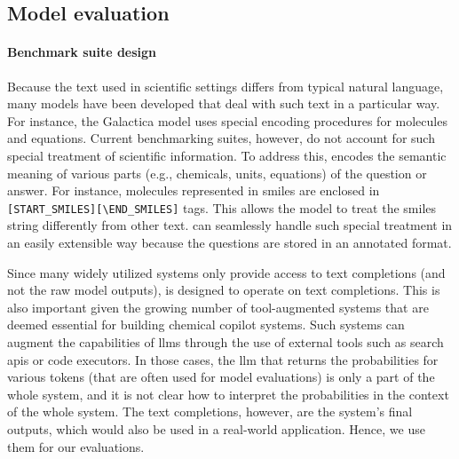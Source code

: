 \documentclass[11pt, oneside]{article}
\begin{document}
\begin{refsection}
\subsection{Model evaluation}

\paragraph{Benchmark suite design} Because the text used in scientific settings differs from typical natural language, many models have been developed that deal with such text in a particular way.
For instance, the Galactica model\autocite{taylor2022galactica} uses special encoding procedures for molecules and equations.
Current benchmarking suites, however, do not account for such special treatment of scientific information.
To address this, \chembench encodes the semantic meaning of various parts (e.g., chemicals, units, equations) of the question or answer.
For instance, molecules represented in \gls{smiles} are enclosed in \texttt{[START\_SMILES][\textbackslash END\_SMILES]} tags.
This allows the model to treat the \gls{smiles} string differently from other text.
\chembench can seamlessly handle such special treatment in an easily extensible way because the questions are stored in an annotated format.

Since many widely utilized systems only provide access to text completions (and not the raw model outputs), \chembench is designed to operate on text completions.
This is also important given the growing number of tool-augmented systems that are deemed essential for building chemical copilot systems.
Such systems can augment the capabilities of \glspl{llm} through the use of external tools such as search \glspl{api} or code executors.\autocite{schick2024toolformer, karpas2022mrkl, yao2022react}
In those cases, the \gls{llm} that returns the probabilities for various tokens (that are often used for model evaluations\autocite{Fourrier_Habib_Launay_Wolf}) is only a part of the whole system, and it is not clear how to interpret the probabilities in the context of the whole system.
The text completions, however, are the system's final outputs, which would also be used in a real-world application.
Hence, we use them for our evaluations.\autocite{xiong2023llms}


\end{refsection}
\end{document}
